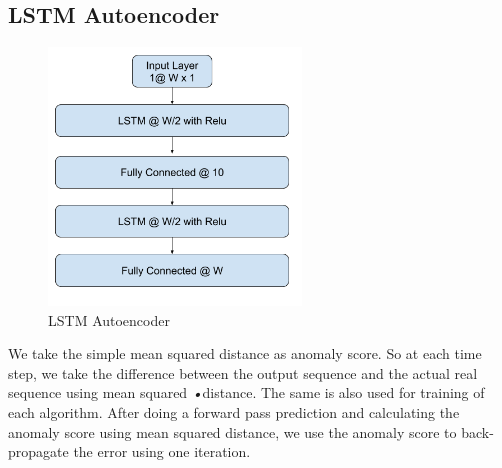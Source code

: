 \documentclass[12pt]{article}
\begin{document}
\subsection{LSTM Autoencoder }
\begin{figure}[H]
\center
        \includegraphics[width=0.6\textwidth]{images/architecture/LstmAutoencoder.png}
    \caption{LSTM Autoencoder}
    \label{lstmAutoencoder}
\end{figure}

We take the simple mean squared distance as anomaly score. So at each time step, we take the difference between the output sequence and the actual real sequence using mean squared \emph{•}distance. The same is also used for training of each algorithm. After doing a forward pass prediction and calculating the anomaly score using mean squared distance, we use the anomaly score to back-propagate the error using one iteration.
\end{document}
